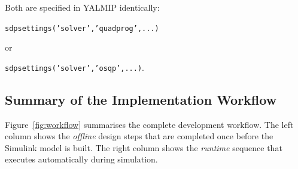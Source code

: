 Both are specified in YALMIP identically:
\begin{center}
\texttt{sdpsettings('solver','quadprog',...)} 
\end{center}


or
\begin{center}
\texttt{sdpsettings('solver','osqp',...)}.
\end{center}


\subsection{Summary of the Implementation Workflow}
\label{subsec:workflow_summary}

Figure~\ref{fig:workflow} summarises the complete development workflow.
The left column shows the \emph{offline} design steps that are
completed once before the Simulink model is built.  The right column
shows the \emph{runtime} sequence that executes automatically during
simulation.

